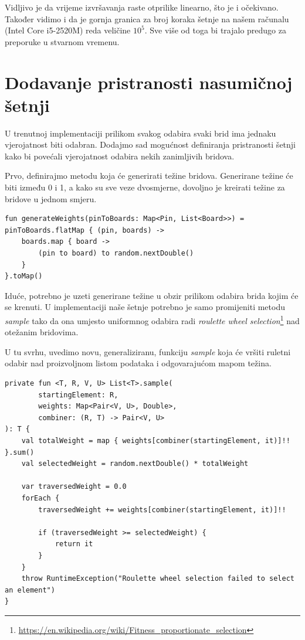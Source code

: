 \documentclass[times, utf8, seminar]{fer}
\begin{document}
Vidljivo je da vrijeme izvršavanja raste otprilike linearno, što je i očekivano. Također vidimo i da je gornja granica za broj koraka šetnje na našem računalu (Intel Core i5-2520M) reda veličine $10^5$. Sve više od toga bi trajalo predugo za preporuke u stvarnom vremenu. 

\section{Dodavanje pristranosti nasumičnoj šetnji}

U trenutnoj implementaciji prilikom svakog odabira svaki brid ima jednaku vjerojatnost biti odabran. Dodajmo sad mogućnost definiranja pristranosti šetnji kako bi povećali vjerojatnost odabira nekih zanimljivih bridova.

Prvo, definirajmo metodu koja će generirati težine bridova. Generirane težine će biti između 0 i 1, a kako su sve veze dvosmjerne, dovoljno je kreirati težine za bridove u jednom smjeru.

\begin{lstlisting}
fun generateWeights(pinToBoards: Map<Pin, List<Board>>) = pinToBoards.flatMap { (pin, boards) ->
    boards.map { board ->
        (pin to board) to random.nextDouble()
    }
}.toMap()
\end{lstlisting}

Iduće, potrebno je uzeti generirane težine u obzir prilikom odabira brida kojim će se krenuti. U implementaciji naše šetnje potrebno je samo promijeniti metodu \textit{sample} tako da ona umjesto uniformnog odabira radi \textit{roulette wheel selection}\footnote{\url{https://en.wikipedia.org/wiki/Fitness_proportionate_selection}} nad otežanim bridovima.

U tu svrhu, uvedimo novu, generaliziranu, funkciju \textit{sample} koja će vršiti ruletni odabir nad proizvoljnom listom podataka i odgovarajućom mapom težina.

\begin{lstlisting}
private fun <T, R, V, U> List<T>.sample(
        startingElement: R,
        weights: Map<Pair<V, U>, Double>,
        combiner: (R, T) -> Pair<V, U>
): T {
    val totalWeight = map { weights[combiner(startingElement, it)]!! }.sum()
    val selectedWeight = random.nextDouble() * totalWeight

    var traversedWeight = 0.0
    forEach {
        traversedWeight += weights[combiner(startingElement, it)]!!

        if (traversedWeight >= selectedWeight) {
            return it
        }
    }
    throw RuntimeException("Roulette wheel selection failed to select an element")
}
\end{lstlisting}
\end{document}
